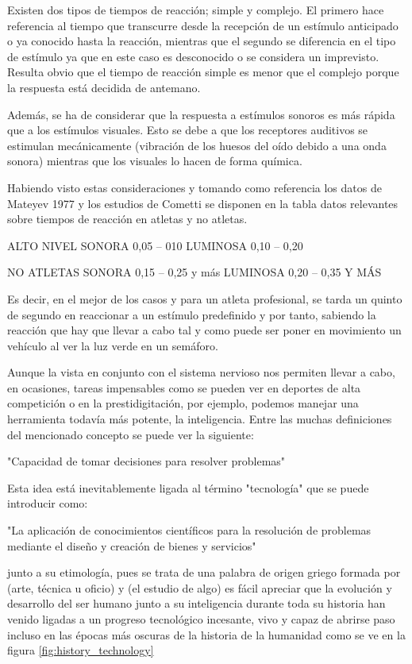 Existen dos tipos de tiempos de reacción\cite{tiempo_reaccion}; simple y complejo. El primero hace referencia al tiempo que transcurre desde la recepción de un estímulo anticipado o ya conocido hasta la reacción, mientras que el segundo se diferencia en el tipo de estímulo ya que en este caso es desconocido o se considera un imprevisto. Resulta obvio que el tiempo de reacción simple es menor que el complejo porque la respuesta está decidida de antemano. 

Además, se ha de considerar que la respuesta a estímulos sonoros es más rápida que a los estímulos visuales. Esto se debe a que los receptores auditivos se estimulan mecánicamente (vibración de los huesos del oído debido a una onda sonora) mientras que los visuales lo hacen de forma química.

Habiendo visto estas consideraciones y tomando como referencia los datos de Mateyev 1977 y los estudios de Cometti se disponen en la tabla  datos relevantes sobre tiempos de reacción en atletas y no atletas.

ALTO NIVEL      SONORA  0,05 – 010
LUMINOSA  0,10 – 0,20

NO ATLETAS      SONORA  0,15 – 0,25 y más
LUMINOSA  0,20 – 0,35 Y MÁS

Es decir, en el mejor de los casos y para un atleta profesional, se tarda un quinto de segundo en reaccionar a un estímulo predefinido y por tanto, sabiendo la reacción que hay que llevar a cabo tal y como puede ser poner en movimiento un vehículo al ver la luz verde en un semáforo.

Aunque la vista en conjunto con el sistema nervioso nos permiten llevar a cabo, en ocasiones, tareas impensables como se pueden ver en deportes de alta competición o en la prestidigitación, por ejemplo, podemos manejar una herramienta todavía más potente, la inteligencia. Entre las muchas definiciones del mencionado concepto se puede ver la siguiente:

"Capacidad de tomar decisiones para resolver problemas"


Esta idea está inevitablemente ligada al término "tecnología" que se puede introducir como:

"La aplicación de conocimientos científicos para la resolución de problemas mediante el diseño y creación de bienes y servicios" 

junto a su etimología, pues se trata de una palabra de origen griego 
formada por 
(arte, técnica u oficio) y 
(el estudio de algo) es fácil apreciar que la evolución y desarrollo del ser humano junto a su inteligencia durante toda su historia han venido ligadas a un progreso tecnológico\cite{historia_tecnologia} incesante, vivo y capaz de abrirse paso incluso en las épocas más oscuras de la historia de la humanidad como se ve en la figura \ref{fig:history_technology} 


